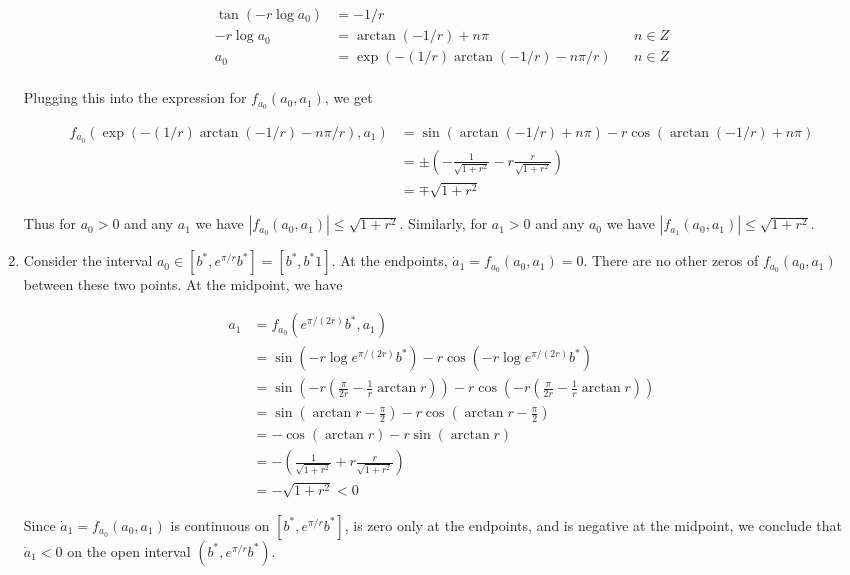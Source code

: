 \documentclass[12pt]{article}
\begin{document}
\begin{enumerate}
\begin{align*}
\tan(-r \log a_0) &= -1/r \\
-r \log a_0 &= \arctan(-1/r) + n \pi && n \in Z \\
a_0 &= \exp\left( -(1/r) \arctan(-1/r) - n \pi/r \right) && n \in Z \\
\end{align*}

Plugging this into the expression for $f_{a_0}(a_0, a_1)$, we get

\begin{align*}
f_{a_0}(\exp(-(1/r) \arctan(-1/r) - n \pi/r), a_1) &=
\sin(\arctan(-1/r) + n \pi) - r \cos(\arctan(-1/r) + n \pi) \\
&= \pm \left( -\frac{1}{\sqrt{1 + r^2}} - r \frac{r}{\sqrt{1 + r^2}} \right) \\
&= \mp \sqrt{1 + r^2}
\end{align*}

Thus for $a_0 > 0$ and any $a_1$ we have $|f_{a_0}(a_0, a_1)| \leq \sqrt{1 + r^2}$. Similarly, for $a_1 > 0$ and any $a_0$ we have $|f_{a_1}(a_0, a_1)| \leq \sqrt{1 + r^2}$. 

\item Consider the interval $a_0 \in [b^*, e^{\pi / r}b^*] = [b^*, b^*{1}]$. At the endpoints, $\dot a_1 = f_{a_0}(a_0, a_1) = 0$. There are no other zeros of $f_{a_0}(a_0, a_1)$ between these two points. At the midpoint, we have

\begin{align*}
a_1 &= f_{a_0}(e^{\pi / (2r)}b^*, a_1) \\
&= \sin(-r \log e^{\pi / (2r)} b^* ) - r \cos( -r \log e^{\pi / (2r)} b^* ) \\
&= \sin\left(-r \left( \frac{\pi}{2r} - \frac{1}{r} \arctan r \right) \right) - r \cos\left(-r \left( \frac{\pi}{2r} - \frac{1}{r} \arctan r \right) \right) \\
&= \sin\left(\arctan r - \frac{\pi}{2} \right) - r \cos\left(\arctan r - \frac{\pi}{2} \right) \\
&= -\cos\left(\arctan r \right) - r \sin\left(\arctan r\right) \\
&= - \left( \frac{1}{\sqrt{1+r^2}} + r \frac{r}{\sqrt{1+r^2}}  \right) \\
&= -\sqrt{1 + r^2} < 0
\end{align*}

Since $\dot a_1 = f_{a_0}(a_0, a_1)$ is continuous on $[b^*, e^{\pi / r}b^*]$, is zero only at the endpoints, and is negative at the midpoint, we conclude that $\dot a_1 < 0$ on the open interval $(b^*, e^{\pi / r}b^*)$.\\


\end{enumerate}
\end{document}
